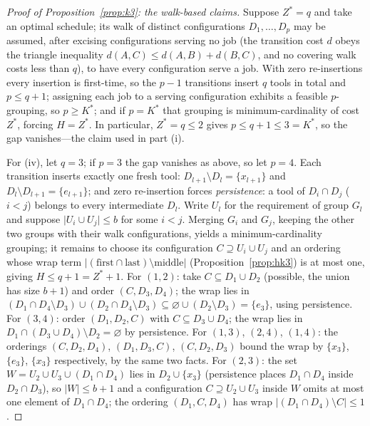 \documentclass[11pt,a4paper]{article}
\theoremstyle{plain}
\theoremstyle{definition}
\theoremstyle{remark}
\newcommand{\Kst}{K^{\ast}}
\newcommand{\Zst}{Z^{\ast}}
\begin{document}
\begin{proof}[Proof of Proposition~\ref{prop:k3}: the walk-based claims]
Suppose $\Zst=q$ and take an optimal schedule; its walk of distinct configurations
$D_1,\dots,D_p$ may be assumed, after excising configurations serving no job (the
transition cost $d$ obeys the triangle inequality
$d(A,C)\le d(A,B)+d(B,C)$, and no covering walk costs less than $q$), to have every
configuration serve a job. With zero re-insertions every insertion is first-time,
so the $p-1$ transitions insert $q$ tools in total and $p\le q+1$; assigning each
job to a serving configuration exhibits a feasible $p$-grouping, so $p\ge\Kst$;
and if $p=\Kst$ that grouping is minimum-cardinality of cost $\Zst$, forcing
$H=\Zst$. In particular, $\Zst=q\le2$ gives $p\le q+1\le3=\Kst$, so the gap
vanishes---the claim used in part (i).

For (iv), let $q=3$; if $p=3$ the gap vanishes as above, so let $p=4$. Each
transition inserts exactly one fresh tool: $D_{l+1}\setminus D_l=\{x_{l+1}\}$ and
$D_l\setminus D_{l+1}=\{e_{l+1}\}$; and zero re-insertion forces
\emph{persistence}: a tool of $D_i\cap D_j$ ($i<j$) belongs to every intermediate
$D_l$. Write $U_l$ for the requirement of group $G_l$ and suppose
$\lvert U_i\cup U_j\rvert\le b$ for some $i<j$. Merging $G_i$ and $G_j$, keeping
the other two groups with their walk configurations, yields a minimum-cardinality
grouping; it remains to choose its configuration $C\supseteq U_i\cup U_j$ and an
ordering whose wrap term $\lvert(\text{first}\cap\text{last})\setminus
\text{middle}\rvert$ (Proposition~\ref{prop:hk3}) is at most one, giving
$H\le q+1=\Zst+1$. For $(1,2)$: take $C\subseteq D_1\cup D_2$ (possible, the union
has size $b{+}1$) and order $(C,D_3,D_4)$; the wrap lies in
$(D_1\cap D_4\setminus D_3)\cup(D_2\cap D_4\setminus D_3)\subseteq\varnothing\cup
(D_2\setminus D_3)=\{e_3\}$, using persistence. For $(3,4)$: order $(D_1,D_2,C)$
with $C\subseteq D_3\cup D_4$; the wrap lies in
$D_1\cap(D_3\cup D_4)\setminus D_2=\varnothing$ by persistence. For $(1,3)$,
$(2,4)$, $(1,4)$: the orderings $(C,D_2,D_4)$, $(D_1,D_3,C)$, $(C,D_2,D_3)$ bound
the wrap by $\{x_3\}$, $\{e_3\}$, $\{x_3\}$ respectively, by the same two facts.
For $(2,3)$: the set $W=U_2\cup U_3\cup(D_1\cap D_4)$ lies in $D_2\cup\{x_3\}$
(persistence places $D_1\cap D_4$ inside $D_2\cap D_3$), so $\lvert W\rvert\le
b{+}1$ and a configuration $C\supseteq U_2\cup U_3$ inside $W$ omits at most one
element of $D_1\cap D_4$; the ordering $(D_1,C,D_4)$ has wrap
$\lvert(D_1\cap D_4)\setminus C\rvert\le1$.
\end{proof}
\end{document}
